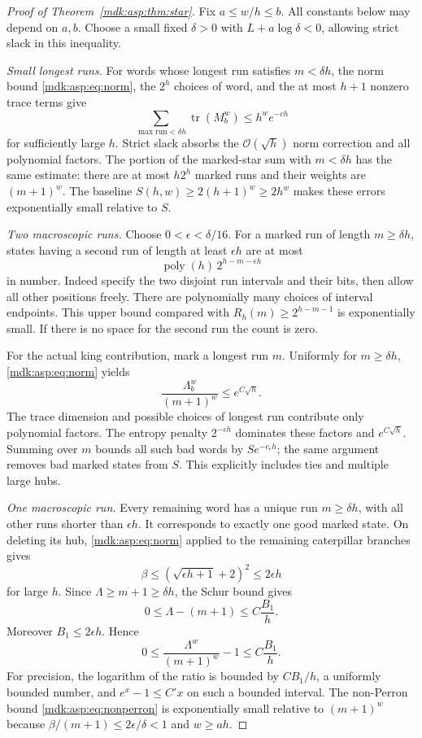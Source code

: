 \documentclass[11pt,letterpaper]{article}
\numberwithin{equation}{section}
\theoremstyle{remark}\newtheorem{remark}[theorem]{Remark}
\newcommand{\Oh}{\mathcal O}\newcommand{\Q}{\mathbb Q}\newcommand{\N}{\mathbb N}\newcommand{\R}{\mathbb R}
\DeclareMathOperator{\tr}{tr}\DeclareMathOperator{\TV}{TV}
\begin{document}
\begin{proof}[Proof of Theorem~\ref{mdk:asp:thm:star}]
Fix $a\le w/h\le b$. All constants below may depend on $a,b$. Choose a small fixed $\delta>0$ with $L+a\log\delta<0$, allowing strict slack in this inequality.

\emph{Small longest runs.} For words whose longest run satisfies $m<\delta h$, the norm bound \eqref{mdk:asp:eq:norm}, the $2^h$ choices of word, and the at most $h+1$ nonzero trace terms give
\[
\sum_{\max\mathrm{run}<\delta h}\tr(M_b^w)\le h^w e^{-ch}
\]
for sufficiently large $h$. Strict slack absorbs the $\Oh(\sqrt h)$ norm correction and all polynomial factors. The portion of the marked-star sum with $m<\delta h$ has the same estimate: there are at most $h2^h$ marked runs and their weights are $(m+1)^w$. The baseline $S(h,w)\ge2(h+1)^w\ge2h^w$ makes these errors exponentially small relative to $S$.

\emph{Two macroscopic runs.} Choose $0<\epsilon<\delta/16$. For a marked run of length $m\ge\delta h$, states having a second run of length at least $\epsilon h$ are at most
\[
\operatorname{poly}(h)\,2^{h-m-\epsilon h}
\]
in number. Indeed specify the two disjoint run intervals and their bits, then allow all other positions freely. There are polynomially many choices of interval endpoints. This upper bound compared with $R_h(m)\ge2^{h-m-1}$ is exponentially small. If there is no space for the second run the count is zero.

For the actual king contribution, mark a longest run $m$. Uniformly for $m\ge\delta h$, \eqref{mdk:asp:eq:norm} yields
\[
\frac{\Lambda_b^w}{(m+1)^w}\le e^{C\sqrt h}.
\]
The trace dimension and possible choices of longest run contribute only polynomial factors. The entropy penalty $2^{-\epsilon h}$ dominates these factors and $e^{C\sqrt h}$. Summing over $m$ bounds all such bad words by $S e^{-c_\epsilon h}$; the same argument removes bad marked states from $S$. This explicitly includes ties and multiple large hubs.

\emph{One macroscopic run.} Every remaining word has a unique run $m\ge\delta h$, with all other runs shorter than $\epsilon h$. It corresponds to exactly one good marked state. On deleting its hub, \eqref{mdk:asp:eq:norm} applied to the remaining caterpillar branches gives
\[
\beta\le(\sqrt{\epsilon h+1}+2)^2\le2\epsilon h
\]
for large $h$. Since $\Lambda\ge m+1\ge\delta h$, the Schur bound gives
\[
0\le\Lambda-(m+1)\le C\frac{B_1}{h}.
\]
Moreover $B_1\le2\epsilon h$. Hence
\begin{equation}\label{mdk:asp:eq:relativeperturb}
0\le\frac{\Lambda^w}{(m+1)^w}-1\le C\frac{B_1}{h}.
\end{equation}
For precision, the logarithm of the ratio is bounded by $CB_1/h$, a uniformly bounded number, and $e^x-1\le C'x$ on such a bounded interval. The non-Perron bound \eqref{mdk:asp:eq:nonperron} is exponentially small relative to $(m+1)^w$ because $\beta/(m+1)\le2\epsilon/\delta<1$ and $w\ge ah$.


\end{proof}
\end{document}
